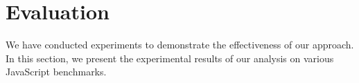 \section{Evaluation}
\label{evaluation}

We have conducted experiments to demonstrate the effectiveness of our approach. In this section, we present the experimental results of our analysis on various JavaScript benchmarks.

